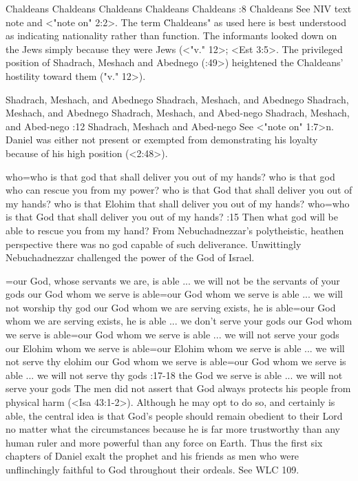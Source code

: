     {Chaldeans} %
    {Chaldeans} %
    {Chaldeans} %
    {Chaldeans} %
    {Chaldeans} %
:8 {Chaldeans} See NIV text note and <"note on" 2:2>. The term 
 \"Chaldeans" as used here is best understood as indicating nationality rather than function. The
informants looked down on the  
Jews simply because they were Jews (<"v." 12>; <Est 3:5>. The privileged position of Shadrach, Meshach and
Abednego (:49>) heightened the Chaldeans' hostility toward them (\<"v." 12>). 

    {Shadrach, Meshach, and Abednego} %
    {Shadrach, Meshach, and Abednego} %
    {Shadrach, Meshach, and Abednego} %
    {Shadrach, Meshach, and Abed-nego} %
    {Shadrach, Meshach, and Abed-nego} %
:12 {Shadrach, Meshach and Abed-nego} See <"note on" 1:7>n. Daniel was either not present or exempted from
demonstrating his loyalty because of his high position (<2:48>).


    {who}={who is that god that shall deliver you out of my hands?} %
    {who is that god who can rescue you from my power?} %
    {who is that God that shall deliver you out of my hands?} %
    {who is that Elohim that shall deliver you out of my hands?} %
    {who}={who is that God that shall deliver you out of my hands?} %
:15 {Then what god will be able to rescue you from my 
hand?} From Nebuchadnezzar's polytheistic, heathen perspective 
there was no god capable of such deliverance. Unwittingly Nebuchadnezzar challenged the power of the
God of Israel. 

={our God, whose servants we are, is able ... we will not be the servants of your gods} %
    {our God whom we serve is able}={our God whom we serve is able ... we will not worship thy god} %
    {our God whom we are serving exists, he is able}={our God whom we are serving exists, he is able ... we don’t serve your gods} %
    {our God whom we serve is able}={our God whom we serve is able ... we will not serve your gods} %
    {our Elohim whom we serve is able}={our Elohim whom we serve is able ... we will not serve thy elohim} %
    {our God whom we serve is able}={our God whom we serve is able ... we will not serve thy gods} %
:17-18 {the God we serve is able ... we will not serve your gods} The men did not assert that God
always protects his people from physical harm (<Isa 43:1-2>). Although he may opt to do so, and
certainly is able, the central idea is that God's people should remain obedient to their Lord no
matter what the circumstances because he is far more trustworthy than any human ruler and more
powerful than any force on Earth. Thus the first six chapters of Daniel exalt the prophet and his
friends as men who were unflinchingly faithful to God throughout their ordeals. See WLC 109.

